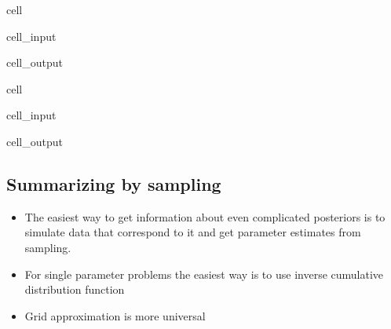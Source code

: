 \documentclass[letterpaper,10pt,english]{jupyterBook}
\begin{document}
\begin{sphinxuseclass}{cell}
\begin{sphinxVerbatimInput}
\begin{sphinxuseclass}{cell_input}
\end{sphinxuseclass}\end{sphinxVerbatimInput}
\begin{sphinxVerbatimOutput}

\begin{sphinxuseclass}{cell_output}
\noindent{}

\end{sphinxuseclass}\end{sphinxVerbatimOutput}

\end{sphinxuseclass}
\begin{sphinxuseclass}{cell}\begin{sphinxVerbatimInput}

\begin{sphinxuseclass}{cell_input}
\begin{sphinxVerbatim}[commandchars=\\\{\}]
\end{sphinxVerbatim}

\end{sphinxuseclass}\end{sphinxVerbatimInput}
\begin{sphinxVerbatimOutput}

\begin{sphinxuseclass}{cell_output}
\noindent{}

\end{sphinxuseclass}\end{sphinxVerbatimOutput}

\end{sphinxuseclass}

\subsection{Summarizing by sampling}
\label{\detokenize{Lecture 3:summarizing-by-sampling}}\begin{itemize}
\item {} 
\sphinxAtStartPar
The easiest way to get information about even complicated posteriors is to simulate data that correspond to it and get parameter estimates from sampling.

\item {} 
\sphinxAtStartPar
For single parameter problems the easiest way is to use inverse cumulative distribution function

\item {} 
\sphinxAtStartPar
Grid approximation is more universal

\end{itemize}
\end{document}
